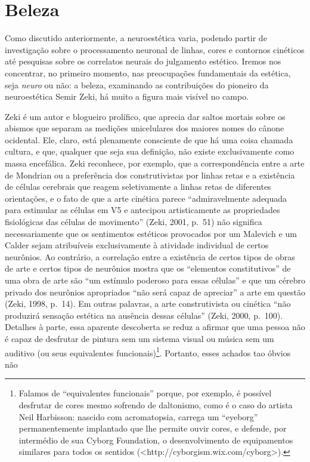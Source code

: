 \chapter{Beleza}

Como discutido anteriormente, a neuroestética varia, podendo partir de
investigação sobre o processamento neuronal de linhas, cores e contornos
cinéticos até pesquisas sobre os correlatos neurais do julgamento
estético. Iremos nos concentrar, no primeiro momento, nas preocupações
fundamentais da estética, seja \emph{neuro} ou não: a beleza, examinando
as contribuições do pioneiro da neuroestética Semir Zeki, há muito a
figura mais visível no campo.

Zeki é um autor e blogueiro prolífico, que aprecia dar saltos mortais
sobre os abismos que separam as medições unicelulares dos maiores nomes
do cânone ocidental. Ele, claro, está plenamente consciente de que há
uma coisa chamada cultura, e que, qualquer que seja sua definição, não
existe exclusivamente como massa encefálica. Zeki reconhece, por
exemplo, que a correspondência entre a arte de Mondrian ou a preferência
dos construtivistas por linhas retas e a existência de células cerebrais
que reagem seletivamente a linhas retas de diferentes orientações, e o
fato de que a arte cinética parece ``admiravelmente adequada para
estimular as células em V5 e antecipou artisticamente as propriedades
fisiológicas das células de movimento'' (Zeki, 2001, p.~51) não significa
necessariamente que os sentimentos estéticos provocados por um Malevich
e um Calder sejam atribuíveis exclusivamente à atividade individual de
certos neurônios. Ao contrário, a correlação entre a existência de
certos tipos de obras de arte e certos tipos de neurônios mostra que os
``elementos constitutivos'' de uma obra de arte são ``um estímulo
poderoso para essas células'' e que um cérebro privado dos neurônios
apropriados ``não será capaz de apreciar'' a arte em questão (Zeki,
1998, p.~14). Em outras palavras, a arte construtivista ou cinética ``não
produzirá sensação estética na ausência dessas células'' (Zeki, 2000,
p.~100). Detalhes à parte, essa aparente descoberta se reduz a afirmar
que uma pessoa não é capaz de desfrutar de pintura sem um sistema visual
ou música sem um auditivo (ou seus equivalentes
funcionais)\footnote[19]{Falamos de ``equivalentes funcionais'' porque, por exemplo, é
possível desfrutar de cores mesmo sofrendo de daltonismo, como é o caso
do artista Neil Harbisson: nascido com acromatopsia, carrega um
``eyeborg'' permanentemente implantado que lhe permite ouvir cores, e
defende, por intermédio de sua Cyborg Foundation, o desenvolvimento de
equipamentos similares para todos os sentidos
(\textless{}http://cyborgism.wix.com/cyborg\textgreater{}).}. Portanto, esses achados tao óbvios não
